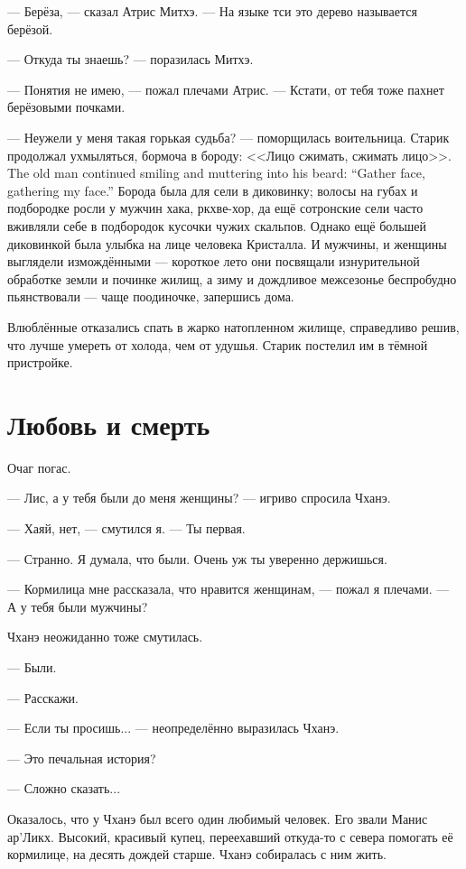 --- Берёза, --- сказал Атрис Митхэ.
--- На языке тси это дерево называется берёзой.

--- Откуда ты знаешь? --- поразилась Митхэ.

--- Понятия не имею, --- пожал плечами Атрис.
--- Кстати, от тебя тоже пахнет берёзовыми почками.

--- Неужели у меня такая горькая судьба? --- поморщилась воительница.
{Старик продолжал ухмыляться, бормоча в бороду: <<Лицо сжимать, сжимать лицо>>.}
{The old man continued smiling and muttering into his beard: ``Gather face, gathering my face.''}
Борода была для сели в диковинку;
волосы на губах и подбородке росли у мужчин хака, ркхве-хор, да ещё сотронские сели часто вживляли себе в подбородок кусочки чужих скальпов.
Однако ещё большей диковинкой была улыбка на лице человека Кристалла.
И мужчины, и женщины выглядели измождёнными --- короткое лето они посвящали изнурительной обработке земли и починке жилищ, а зиму и дождливое межсезонье беспробудно пьянствовали --- чаще поодиночке, запершись дома.

Влюблённые отказались спать в жарко натопленном жилище, справедливо решив, что лучше умереть от холода, чем от удушья.
Старик постелил им в тёмной пристройке.

\section{Любовь и смерть}

Очаг погас.

--- Лис, а у тебя были до меня женщины? --- игриво спросила Чханэ.

--- Хаяй, нет, --- смутился я.
--- Ты первая.

--- Странно.
Я думала, что были.
Очень уж ты уверенно держишься.

--- Кормилица мне рассказала, что нравится женщинам, --- пожал я плечами.
--- А у тебя были мужчины?

Чханэ неожиданно тоже смутилась.

--- Были.

--- Расскажи.

--- Если ты просишь... --- неопределённо выразилась Чханэ.

--- Это печальная история?

--- Сложно сказать...

Оказалось, что у Чханэ был всего один любимый человек.
Его звали Манис ар’Ликх.
Высокий, красивый купец, переехавший откуда-то с севера помогать её кормилице, на десять дождей старше.
Чханэ собиралась с ним жить.

